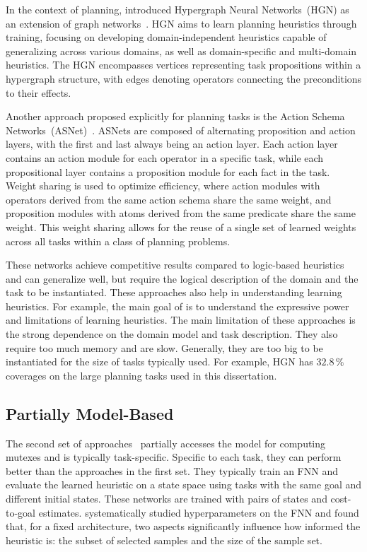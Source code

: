 In the context of planning, \citet{shen2020learning} introduced Hypergraph Neural Networks~(HGN) as an extension of graph networks~\cite{battaglia2018relational}. HGN aims to learn planning heuristics through training, focusing on developing domain-independent heuristics capable of generalizing across various domains, as well as domain-specific and multi-domain heuristics. The HGN encompasses vertices representing task propositions within a hypergraph structure, with edges denoting operators connecting the preconditions to their effects.

Another approach proposed explicitly for planning tasks is the Action Schema Networks~(ASNet)~\cite{toyer2018action}. ASNets are composed of alternating proposition and action layers, with the first and last always being an action layer. Each action layer contains an action module for each operator in a specific task, while each propositional layer contains a proposition module for each fact in the task. Weight sharing is used to optimize efficiency, where action modules with operators derived from the same action schema share the same weight, and proposition modules with atoms derived from the same predicate share the same weight. This weight sharing allows for the reuse of a single set of learned weights across all tasks within a class of planning problems.

These networks achieve competitive results compared to logic-based heuristics and can generalize well, but require the logical description of the domain and the task to be instantiated. These approaches also help in understanding learning heuristics. For example, the main goal of \citet{stahlberg2022learning} is to understand the expressive power and limitations of learning heuristics. The main limitation of these approaches is the strong dependence on the domain model and task description. They also require too much memory and are slow. Generally, they are too big to be instantiated for the size of tasks typically used. For example, HGN has $32.8\,\%$ coverages on the large planning tasks used in this dissertation.

\subsection{Partially Model-Based}
\label{sec:related-work-partially}

The second set of approaches~\cite{ferber2020neural, yu2020learning, ferber2022neural, otoole2022sampling} partially accesses the model for computing mutexes and is typically task-specific. Specific to each task, they can perform better than the approaches in the first set. They typically train an FNN and evaluate the learned heuristic on a state space using tasks with the same goal and different initial states. These networks are trained with pairs of states and cost-to-goal estimates. \citet{ferber2020neural} systematically studied hyperparameters on the FNN and found that, for a fixed architecture, two aspects significantly influence how informed the heuristic is: the subset of selected samples and the size of the sample set.

